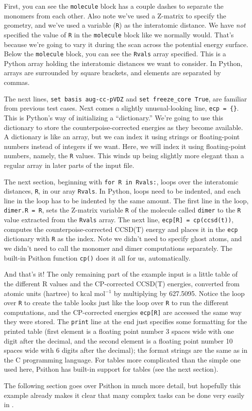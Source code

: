 First, you can see the {\tt molecule} block has a couple dashes to
separate the monomers from each other.  Also note we've used a Z-matrix to
specify the geometry, and we've used a variable ({\tt R}) as the
interatomic distance.  We have {\em not} specified the value of {\tt R} in
the {\tt molecule} block like we normally would.  That's because we're
going to vary it during the scan across the potential energy surface.
Below the {\tt molecule} block, you can see the {\tt Rvals} array
specified.  This is a Python array holding the interatomic distances we
want to consider.  In Python, arrays are surrounded by square brackets, and
elements are separated by commas.

The next lines, {\tt set basis aug-cc-pVDZ} and {\tt set freeze\_core
True}, are familiar from previous test cases.  Next comes a slightly
unusual-looking line, {\tt ecp = \{\}}.  This is Python's way of initializing
a ``dictionary.''  We're going to use this dictionary to store the
counterpoise-corrected energies as they become available.  A dictionary is
like an array, but we can index it using strings or floating-point numbers
instead of integers if we want.  Here, we will index it using
floating-point numbers, namely, the {\tt R} values.  This winds up being
slightly more elegant than a regular array in later parts of the input
file.

The next section, beginning with {\tt for R in Rvals:}, loops over the
interatomic distances, {\tt R}, in our aray {\tt Rvals}.  In Python,
loops need to be indented, and each line in the loop has to be indented
by the same amount.  The first line in the loop, {\tt dimer.R = R},
sets the Z-matrix variable {\tt R} of the molecule called {\tt dimer}
to the {\tt R} value extracted from the {\tt Rvals} array.  The next line,
{\tt ecp[R] = cp(\qq ccsd(t)\qq)}, computes the counterpoise-corrected
CCSD(T) energy and places it in the {\tt ecp} dictionary with {\tt R} as
the index.  Note we didn't need to specify ghost atoms, and we didn't need
to call the monomer and dimer computations separately.  The built-in
Psithon function {\tt cp()} does it all for us, automatically.

And that's it!  The only remaining part of the example input is a little
table of the different R values and the CP-corrected CCSD(T) energies,
converted from atomic units (hartree) to kcal mol$^{-1}$ by multiplying by 
627.5095.  Notice
the loop over {\tt R} to create the table looks just like the loop over
{\tt R} to run the different computations, and the CP-corrected energies 
{\tt ecp[R]} are accessed the same way they were stored.  The {\tt print}
line at the end just specifies some formatting for the printed table (first
element is a floating point number 3 spaces wide with one digit after the
decimal, and the second element is a floating point number 10 spaces wide
with 6 digits after the decimal); the format strings are the same as in the
C programming language.  For tables more complicated than the simple one
used here, Psithon has built-in support for tables (see the next section).

The following section goes over Psithon in much more detail, but
hopefully this example already makes it clear that many complex tasks
can be done very easily in \PSIfour.

